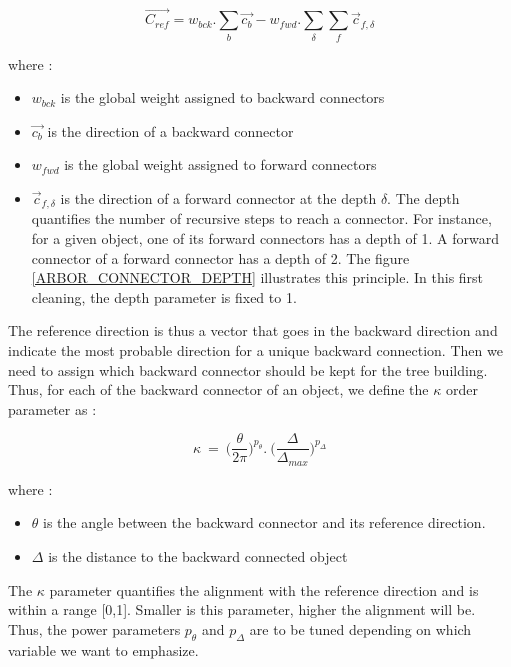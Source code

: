 \documentclass[cits]{JINST}
\begin{document}
\begin{equation}
  \vec{C_{ref}} = w_{bck} . \sum_b \vec{c_{b}} - w_{fwd} . \sum_\delta \sum_f \vec{c}_{f,\delta}
\end{equation}

where :

\begin{itemize}
  \item $w_{bck}$ is the global weight assigned to backward connectors
  \item $\vec{c_{b}}$ is the direction of a backward connector 
  \item $w_{fwd}$ is the global weight assigned to forward connectors
  \item $\vec{c}_{f,\delta}$ is the direction of a forward connector at the depth $\delta$. The depth quantifies the number of recursive steps to reach a connector. For instance, for a given object, one of its forward connectors has a depth of 1. A forward connector of a forward connector has a depth of 2. The figure \ref{ARBOR_CONNECTOR_DEPTH} illustrates this principle. In this first cleaning, the depth parameter is fixed to 1.
\end{itemize}

The reference direction is thus a vector that goes in the backward direction and indicate the most probable direction for a unique backward connection. Then we need to assign which backward connector should be kept for the tree building. Thus, for each of the backward connector of an object, we define the $\kappa$ order parameter as :

\begin{equation}
  \kappa~=~\Big(\frac{\theta}{2\pi}\Big)^{p_{\theta}} . ~\Big(\frac{\Delta}{\Delta_{max}}\Big)^{p_{\Delta}} 
\end{equation}

where :

\begin{itemize}
  \item $\theta$ is the angle between the backward connector and its reference direction.
  \item $\Delta$ is the distance to the backward connected object
\end{itemize}

The $\kappa$ parameter quantifies the alignment with the reference direction and is within a range [0,1]. Smaller is this parameter, higher the alignment will be. Thus, the power parameters $p_{\theta}$ and $p_{\Delta}$ are to be tuned depending on which variable we want to emphasize. 
\end{document}
